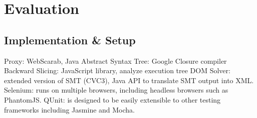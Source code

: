 \section{Evaluation}

\subsection{Implementation \& Setup}

Proxy: WebScarab, Java
Abstract Syntax Tree: Google Closure compiler
Backward Slicing: JavaScript library, analyze execution tree
DOM Solver: extended version of SMT (CVC3), Java API to translate SMT output into XML.
Selenium: runs on multiple browsers, including headless browsers such as PhantomJS.
QUnit:  \tool is designed to be easily extensible to other testing frameworks including Jasmine and Mocha.


